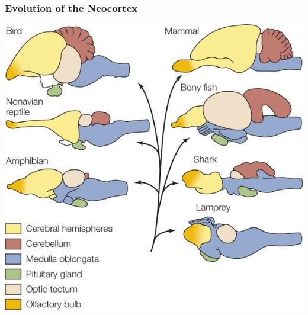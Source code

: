 \documentclass[16pt]{beamer}
\begin{document}
\begin{frame}
\frametitle{Evolution of the Neocortex}
\centering
\includegraphics[scale=0.4]{lamprey-to-neocortex.jpg}
\end{frame}
\end{document}
